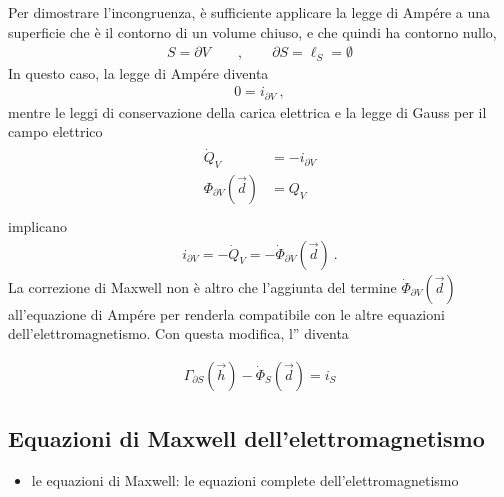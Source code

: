 \documentclass[letterpaper,10pt,italian]{jupyterBook}
\begin{document}
\sphinxAtStartPar
Per dimostrare l’incongruenza, è sufficiente applicare la legge di Ampére a una superficie che è il contorno di un volume chiuso, e che quindi ha contorno nullo,
\begin{equation*}
\begin{split}S = \partial V  \qquad , \qquad  \partial S = \ell_S = \emptyset\end{split}
\end{equation*}
\sphinxAtStartPar
In questo caso, la legge di Ampére diventa
\begin{equation*}
\begin{split}0 = i_{\partial V} \ ,\end{split}
\end{equation*}
\sphinxAtStartPar
mentre le leggi di conservazione della carica elettrica e la legge di Gauss per il campo elettrico
\begin{equation*}
\begin{split}\begin{aligned}
  \dot{Q}_V & = - i_{\partial V} \\
  \Phi_{\partial V}(\vec{d}) & = Q_V \\
\end{aligned}\end{split}
\end{equation*}
\sphinxAtStartPar
implicano
\begin{equation*}
\begin{split}i_{\partial V} = - \dot{Q}_V = - \dot{\Phi}_{\partial V}(\vec{d}) \ .\end{split}
\end{equation*}
\sphinxAtStartPar
La correzione di Maxwell non è altro che l’aggiunta del termine \(\dot{\Phi}_{\partial V}(\vec{d})\) all’equazione di Ampére per renderla compatibile con le altre equazioni dell’elettromagnetismo. Con questa modifica, l” diventa

\sphinxAtStartPar
{} 
\begin{equation*}
\begin{split}\Gamma_{\partial S}(\vec{h}) - \dot{\Phi}_{S}(\vec{d}) = i_S \end{split}
\end{equation*}

\subsection{Equazioni di Maxwell dell’elettromagnetismo}
\label{\detokenize{ch/electromagnetism/electromagnetism-general:equazioni-di-maxwell-dell-elettromagnetismo}}\label{\detokenize{ch/electromagnetism/electromagnetism-general:physics-hs-electromagnetism-electromagnetism-general-maxwell}}\begin{itemize}
\item {} 
\sphinxAtStartPar
le equazioni di Maxwell: le equazioni complete dell’elettromagnetismo

\end{itemize}
\end{document}
